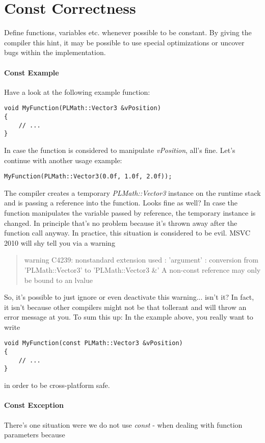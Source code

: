 \section{Const Correctness}
Define functions, variables etc. whenever possible to be constant. By giving the compiler this hint, it may be possible to use special optimizations or uncover bugs within the implementation.


\paragraph{Const Example}
Have a look at the following example function:
\begin{lstlisting}[caption=Non-constant function parameter]
void MyFunction(PLMath::Vector3 &vPosition)
{
	// ...
}
\end{lstlisting}
In case the function is considered to manipulate \emph{vPosition}, all's fine. Let's continue with another usage example:
\begin{lstlisting}[caption=Using a temporary variable instance as non-constant function parameter]
MyFunction(PLMath::Vector3(0.0f, 1.0f, 2.0f));
\end{lstlisting}
The compiler creates a temporary \emph{PLMath::Vector3} instance on the runtime stack and is passing a reference into the function. Looks fine as well? In case the function manipulates the variable passed by reference, the temporary instance is changed. In principle that's no problem because it's thrown away after the function call anyway. In practice, this situation is considered to be evil. \ac{MSVC} 2010 will shy tell you via a warning
\begin{quote}warning C4239: nonstandard extension used : 'argument' : conversion from 'PLMath::Vector3' to 'PLMath::Vector3 \&' A non-const reference may only be bound to an lvalue\end{quote}
So, it's possible to just ignore or even deactivate this warning... isn't it? In fact, it isn't because other compilers might not be that tollerant and will throw an error message at you. To sum this up: In the example above, you really want to write
\begin{lstlisting}[caption=Constant function parameter]
void MyFunction(const PLMath::Vector3 &vPosition)
{
	// ...
}
\end{lstlisting}
in order to be cross-platform safe.


\paragraph{Const Exception}
There's one situation were we do not use \emph{const} - when dealing with function parameters because

